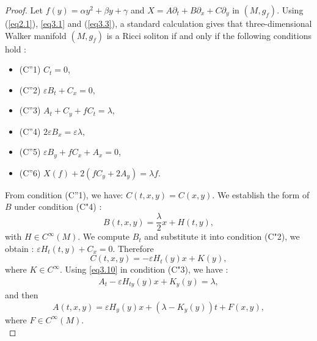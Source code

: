 \documentclass[10pt,a4paper]{amsart}
\begin{document}
\begin{proof}
Let $f(y)=\alpha y^{2}+\beta y+\gamma$ and 
$X = A\partial_t+ B\partial_x + C \partial_y $ in $(M, g_f)$.  Using (\ref{eq2.1}),  \eqref{eq3.1} and (\ref{eq3.3}), a standard calculation gives that three-dimensional 
Walker manifold $(M,g_f)$ is a Ricci soliton if and only if the following conditions hold :
\begin{itemize}
\item (C''1) $C_t= 0$,  
\item (C''2) $\varepsilon B_t +C_x= 0$,  
\item (C''3) $A_t +C_y +fC_t=\lambda$,  
\item (C''4) $2\varepsilon B_x=\varepsilon\lambda$,  
\item (C''5) $\varepsilon B_y +fC_x +A_x=0$,  
\item (C''6) $ X(f)+2\left( fC_y+2A_y\right)  =\lambda f$. 
\end{itemize}
From condition (C''1), we have: $C(t,x,y) = C(x,y)$. We establish the form of $B$ 
under condition (C"4) :
\begin{equation}\label{eq3.9}
B(t,x,y)= \frac{\lambda}{2}x + H(t,y),
\end{equation}
with $H \in C^{\infty}(M)$. We compute $B_t$ and substitute it into condition (C"2), 
we obtain : $\varepsilon H_{t}(t,y) + C_{x}=0$. Therefore
\begin{equation}\label{eq3.10}
	C(t,x,y)=-\varepsilon H_{t}(y)x + K(y),
\end{equation}
where $K\in C^{\infty}$. Using \eqref{eq3.10} in condition (C"3), we have :
\begin{eqnarray*}
A_t -\varepsilon H_{ty}(y)x + K_{y}(y) = \lambda,
\end{eqnarray*} 
and then
\begin{equation}\label{eq3.11}
A(t,x,y)=\varepsilon H_{y}(y)x+\left( \lambda-K_{y}(y)\right) t + F(x,y),
\end{equation}
where $F\in C^{\infty}(M)$. \\


\end{proof}
\end{document}
